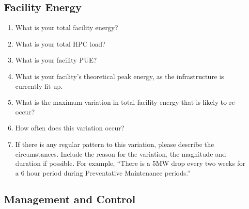 \subsection*{Facility Energy}
\begin{enumerate}  %
\item
What is your total facility energy?

\item
What is your total HPC load?

\item
What is your facility PUE?

\item
What is your facility's theoretical peak energy, as the infrastructure is currently fit up.

\item
What is the maximum variation in total facility energy that is likely to re-occur? 

\item
 How often does this variation occur?

\item
If there is any regular pattern to this variation, please describe the circumstances. 
Include the reason for the variation, the magnitude and duration if possible. 
For example, ``There is a 5MW drop every two weeks for a 6 hour period during Preventative 
Maintenance periods.''
\end{enumerate}

\subsection*{Management and Control}

